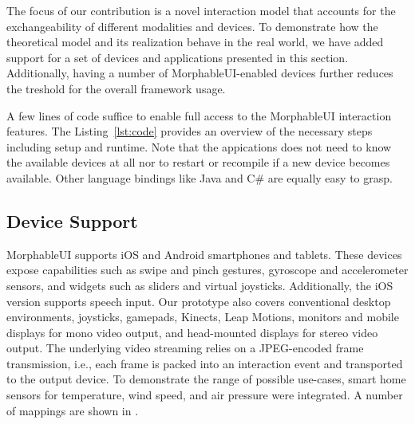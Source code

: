 \documentclass[twoside,twocolumn,10pt]{article}
\begin{document}


The focus of our contribution is a novel interaction model that accounts for the exchangeability of different modalities and devices.
To demonstrate how the theoretical model and its realization behave in the real world, we have added support for a set of devices and applications presented in this section. Additionally, having a number of MorphableUI-enabled devices further reduces the treshold for the overall framework usage.

A few lines of code suffice to enable full access to the MorphableUI interaction features. The Listing~\ref{lst:code} provides an overview of the necessary steps including setup and runtime. Note that the appications does not need to know the available devices at all nor to restart or recompile if a new device becomes available. Other language bindings like Java and C\# are equally easy to grasp.


\subsection{Device Support}

MorphableUI supports iOS and Android smartphones and tablets.
These devices expose capabilities such as swipe and pinch gestures, gyroscope and accelerometer sensors, and widgets such as sliders and virtual joysticks.
Additionally, the iOS version supports speech input.
Our prototype also covers conventional desktop environments, joysticks, gamepads, Kinects, Leap Motions, monitors and mobile displays for mono video output, and head-mounted displays for stereo video output.
The underlying video streaming relies on a JPEG-encoded frame transmission, i.e., each frame is packed into an interaction event and transported to the output device.
To demonstrate the range of possible use-cases, smart home sensors for temperature, wind speed, and air pressure were integrated.
A number of mappings are shown in .
\end{document}
